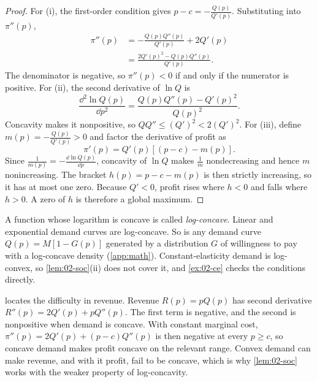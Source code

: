 \begin{proof}
For (i), the first-order condition gives $p - c = -\frac{Q(p)}{Q'(p)}$. Substituting into $\pi''(p)$,
\begin{align*}
  \pi''(p) &= -\frac{Q(p)Q''(p)}{Q'(p)} + 2Q'(p) \\
           &= \frac{2Q'(p)^2 - Q(p)Q''(p)}{Q'(p)} .
\end{align*}
The denominator is negative, so $\pi''(p) < 0$ if and only if the numerator is positive. For (ii), the second
derivative of $\ln Q$ is
\[
  \frac{\dd^2 \ln Q(p)}{\dd p^2} = \frac{Q(p)Q''(p) - Q'(p)^2}{Q(p)^2} .
\]
Concavity makes it nonpositive, so $QQ'' \le (Q')^2 < 2(Q')^2$. For (iii), define $m(p) = -\frac{Q(p)}{Q'(p)} > 0$
and factor the derivative of profit as
\[
  \pi'(p) = Q'(p)\left[(p - c) - m(p)\right] .
\]
Since $\frac{1}{m(p)} = -\frac{\dd \ln Q(p)}{\dd p}$, concavity of $\ln Q$ makes $\frac{1}{m}$ nondecreasing and
hence $m$ nonincreasing. The bracket $h(p) = p - c - m(p)$ is then strictly increasing, so it has at most one zero.
Because $Q' < 0$, profit rises where $h < 0$ and falls where $h > 0$. A zero of $h$ is therefore a global maximum.
\end{proof}

A function whose logarithm is concave is called \emph{log-concave}. Linear and exponential demand curves are
log-concave. So is any demand curve $Q(p) = M[1 - G(p)]$ generated by a distribution $G$ of willingness to pay with
a log-concave density (\cref{app:math}). Constant-elasticity demand is log-convex, so \cref{lem:02-soc}(ii) does not
cover it, and \cref{ex:02-ce} checks the conditions directly.

\citet[sec.~1.1.1.4]{Tirole1988} locates the difficulty in revenue. Revenue $R(p) = pQ(p)$ has second derivative
$R''(p) = 2Q'(p) + pQ''(p)$. The first term is negative, and the second is nonpositive when demand is concave. With
constant marginal cost, $\pi''(p) = 2Q'(p) + (p - c)Q''(p)$ is then negative at every $p \ge c$, so concave demand
makes profit concave on the relevant range. Convex demand can make revenue, and with it profit, fail to be concave,
which is why \cref{lem:02-soc} works with the weaker property of log-concavity.

